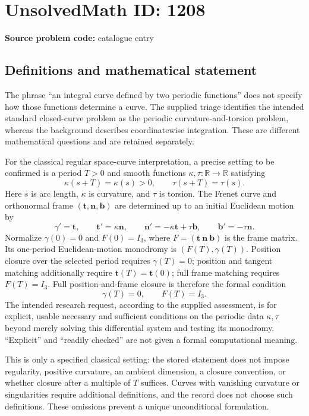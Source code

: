 \documentclass[11pt]{article}
\newcommand{\R}{\mathbb{R}}
\begin{document}
\section*{UnsolvedMath ID: 1208}
\textbf{Source problem code:} catalogue entry
\subsection{Definitions and mathematical statement}
The phrase ``an integral curve defined by two periodic functions'' does not specify how those functions determine a curve. The supplied triage identifies the intended standard closed-curve problem as the periodic curvature-and-torsion problem, whereas the background describes coordinatewise integration. These are different mathematical questions and are retained separately.

For the classical regular space-curve interpretation, a precise setting to be confirmed is a period $T>0$ and smooth functions $\kappa,\tau:\R\to\R$ satisfying
\[
\kappa(s+T)=\kappa(s)>0,\qquad \tau(s+T)=\tau(s).
\]
Here $s$ is arc length, $\kappa$ is curvature, and $\tau$ is torsion. The Frenet curve and orthonormal frame $(\mathbf t,\mathbf n,\mathbf b)$ are determined up to an initial Euclidean motion by
\[
\gamma'=\mathbf t,\qquad
\mathbf t'=\kappa\mathbf n,\qquad
\mathbf n'=-\kappa\mathbf t+\tau\mathbf b,\qquad
\mathbf b'=-\tau\mathbf n.
\]
Normalize $\gamma(0)=0$ and $F(0)=I_3$, where $F=(\mathbf t\ \mathbf n\ \mathbf b)$ is the frame matrix. Its one-period Euclidean-motion monodromy is $(F(T),\gamma(T))$. Position closure over the selected period requires $\gamma(T)=0$; position and tangent matching additionally require $\mathbf t(T)=\mathbf t(0)$; full frame matching requires $F(T)=I_3$. Full position-and-frame closure is therefore the formal condition
\[
\gamma(T)=0,\qquad F(T)=I_3.
\]
The intended research request, according to the supplied assessment, is for explicit, usable necessary and sufficient conditions on the periodic data $\kappa,\tau$ beyond merely solving this differential system and testing its monodromy. ``Explicit'' and ``readily checked'' are not given a formal computational meaning.

This is only a specified classical setting: the stored statement does not impose regularity, positive curvature, an ambient dimension, a closure convention, or whether closure after a multiple of $T$ suffices. Curves with vanishing curvature or singularities require additional definitions, and the record does not choose such definitions. These omissions prevent a unique unconditional formulation.
\end{document}
